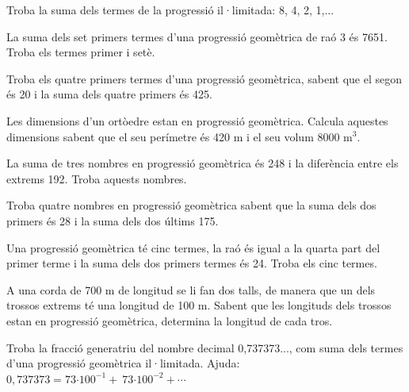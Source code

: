 \begin{activitats}
\begin{mylist}
\exer  Troba la suma dels termes de la progressió il·limitada: 8, 4, 2, 1,... 

\exer  La suma dels set primers termes d'una progressió geomètrica de raó 3 és 7651. Troba els termes primer i setè. 

\exer \hot  Troba els quatre primers termes d'una progressió geomètrica, sabent que el segon és 20 i la suma dels quatre primers és 425. 

\exer  Les dimensions d'un ortòedre estan en progressió geomètrica. Calcula aquestes dimensions sabent que el seu perímetre és 420 m i el seu volum 8000 m${}^{3}$.

\exer  La suma de tres nombres en progressió geomètrica és 248 i la diferència entre els extrems 192. Troba aquests nombres. 

\exer  Troba quatre nombres en progressió geomètrica sabent que la suma dels dos primers és 28 i la suma dels dos últims 175. 
 
\exer  Una progressió geomètrica té cinc termes, la raó és igual a la quarta part del primer terme i la suma dels dos primers termes és 24. Troba els cinc termes. 

\exer  A una corda de 700 m de longitud se li fan dos talls, de manera que un dels trossos extrems té una longitud de 100 m. Sabent que les longituds dels trossos estan en progressió geomètrica, determina la longitud de cada tros. 

\exer  Troba la fracció generatriu del nombre decimal 0,737373..., com suma dels termes d'una progressió geomètrica il·limitada.  Ajuda:  $0,737373=73\textrm{·}{100}^{-1}+\ 73\textrm{·}{100}^{-2}+\cdots$


\end{mylist}
\end{activitats}
